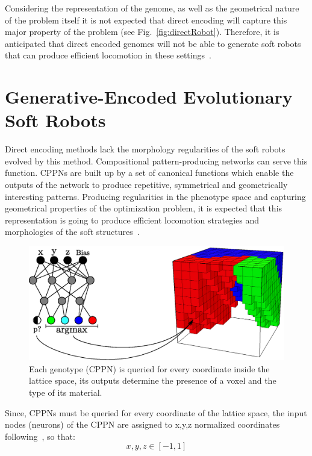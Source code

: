 Considering the representation of the genome, as well as the geometrical nature of the problem itself it is not expected that direct encoding will capture this major property of the problem (see Fig.~\ref{fig:directRobot}). Therefore, it is anticipated that direct encoded genomes will not be able to generate soft robots that can produce efficient locomotion in these settings~\citep{cheney2013unshackling}.





\section{Generative-Encoded Evolutionary Soft Robots}

Direct encoding methods lack the morphology regularities of the soft robots evolved by this method. Compositional pattern-producing networks can serve this function. CPPNs are built up by a set of canonical functions which enable the outputs of the network to produce repetitive, symmetrical and geometrically interesting patterns. Producing regularities in the phenotype space and capturing geometrical properties of the optimization problem, it is expected that this representation is going to produce efficient locomotion strategies and morphologies of the soft structures~\citep{cheney2013unshackling}.
\begin{figure}
\centering
\includegraphics[height=0.2\textheight]{../Figures/Misc/cppnSoftBot.eps}
\caption{Each genotype (CPPN) is queried for every coordinate inside the lattice space, its outputs determine the presence of a voxel and the type of its material.}
\label{fig:cppnDiagram}
\end{figure}
Since, CPPNs must be queried for every coordinate of the lattice space, the input nodes (neurons) of the CPPN are assigned to x,y,z normalized coordinates following~\citep{cheney2013unshackling}, so that:
\[x,y,z \in [-1,1]\]
